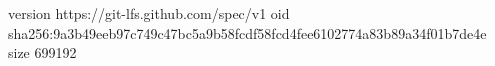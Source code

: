 version https://git-lfs.github.com/spec/v1
oid sha256:9a3b49eeb97c749c47bc5a9b58fcdf58fcd4fee6102774a83b89a34f01b7de4e
size 699192
